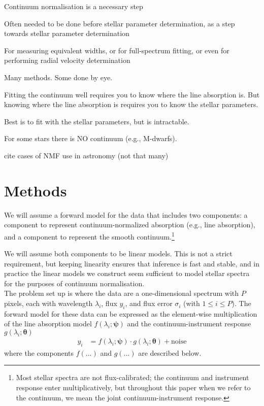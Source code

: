 \documentclass[modern]{aastex631}
\newcommand{\vectheta}{\boldsymbol{\theta}}
\newcommand{\vecpsi}{\boldsymbol{\psi}}
\begin{document}
Continuum normalisation is a necessary step

Often needed to be done before stellar parameter determination, as a step towards stellar parameter determination

For measuring equivalent widths, or for full-spectrum fitting, or even for performing radial velocity determination

Many methods. Some done by eye.

Fitting the continuum well requires you to know where the line absorption is. But knowing where the line absorption is requires you to know the stellar parameters.

Best is to fit with the stellar parameters, but is intractable.

For some stars there is NO continuum (e.g., M-dwarfs). 

cite cases of NMF use in astronomy (not that many)


\section{Methods}\label{sec:methods}

We will assume a forward model for the data that includes two components: a component to represent continuum-normalized absorption (e.g., line absorption), and a component to represent the smooth continuum.\footnote{Most stellar spectra are not flux-calibrated; the continuum and instrument response enter multiplicatively, but throughout this paper when we refer to the continuum, we mean the joint continuum-instrument response.}

We will assume both components to be linear models. This is not a strict requirement, but keeping linearity ensures that  inference is fast and stable, and in practice the linear models we construct seem sufficient to model stellar spectra for the purposes of continuum normalisation.\\



The problem set up is where the data are a one-dimensional spectrum with $P$ pixels, each with wavelength $\lambda_i$, flux $y_i$, and flux error $\sigma_i$ (with $1 \leq i \leq P$). The forward model for these data can be expressed as the element-wise multiplication of the line absorption model $f(\lambda_i; \vecpsi)$ and the continuum-instrument response $g(\lambda_i;\vectheta)$
\begin{align}
    y_i &= f(\lambda_i;\vecpsi)\cdot{}g(\lambda_i;\vectheta) + \mbox{noise}
\end{align}
where the components $f(...)$ and $g(...)$ are described below.\\
\end{document}
